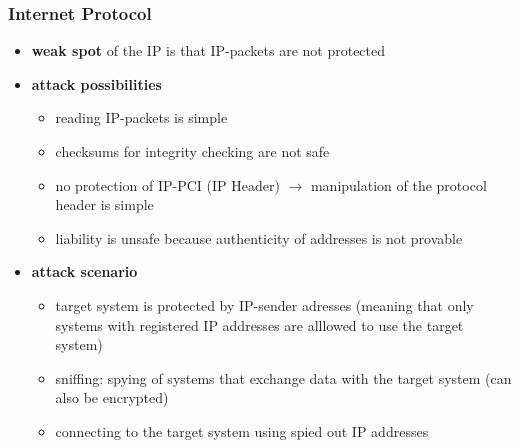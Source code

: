 \documentclass[11pt]{article}
\begin{document}
\subsubsection{Internet Protocol}
\label{sec:org4a2f016}
\begin{itemize}
\item \textbf{weak spot} of the IP is that IP-packets are not protected
\item \textbf{attack possibilities}
\begin{itemize}
\item reading IP-packets is simple
\item checksums for integrity checking are not safe
\item no protection of IP-PCI (IP Header) \(\rightarrow\) manipulation of the protocol header is simple
\item liability is unsafe because authenticity of addresses is not provable
\end{itemize}
\item \textbf{attack scenario}
\begin{itemize}
\item target system is protected by IP-sender adresses (meaning that only systems with registered IP addresses are alllowed to use the target system)
\item sniffing: spying of systems that exchange data with the target system (can also be encrypted)
\item connecting to the target system using spied out IP addresses
\end{itemize}
\end{itemize}
\end{document}
